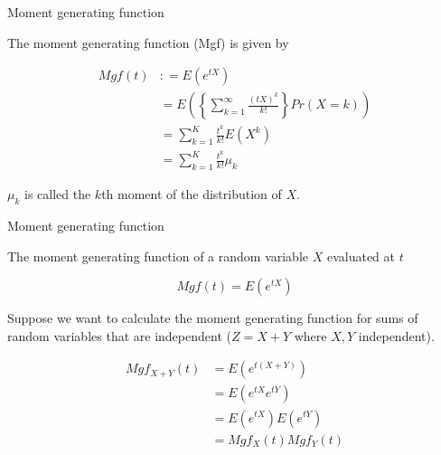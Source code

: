 \documentclass{beamer}\usepackage[]{graphicx}\usepackage[]{color}
\begin{document}
\begin{frame}[fragile]{Moment generating function \;\;}

The moment generating function (Mgf) is given by

\begin{align}
Mgf(t) & : = E(e^{tX}) \\
& = E \left ( \left \{ \sum_{k=1}^{\infty} \frac{(tX)^{k}}{k!} \right \} Pr(X=k) \right) \\
& = \sum_{k=1}^{K} \frac{t^{k}}{k!} E \left ( X^{k} \right) \\
& = \sum_{k=1}^{K} \frac{t^{k}}{k!} \mu_{k}
\end{align}

$\mu_{k}$ is called the $k$th moment of the distribution of $X$. 

\end{frame}


\begin{frame}{Moment generating function}

The moment generating function of a random variable $X$ evaluated at $t$

$$ Mgf (t) = E \left ( e^{tX} \right) $$

Suppose we want to calculate the moment generating function for sums of random variables that are independent ($Z=X+Y$ where $X,Y$ independent).

\begin{align}
Mgf_{X+Y}(t) & = E \left ( e^{t(X+Y)} \right ) \\
       & = E \left ( e^{tX}e^{tY} \right)  \\
       & = E \left ( e^{tX} \right) E \left ( e^{tY} \right) \\
       & = Mgf_X(t) Mgf_Y(t) \\
\end{align}

 \end{frame}
\end{document}
